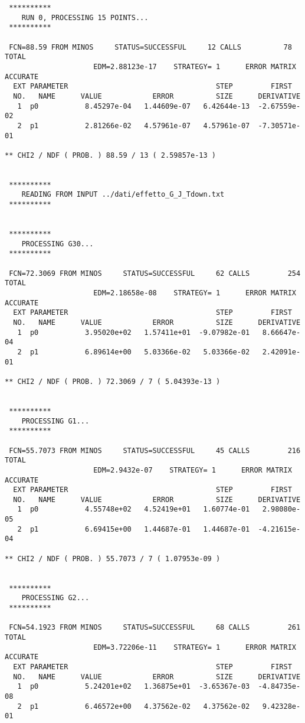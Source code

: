 {\fontsize{6}{6}
\begin{verbatim}
 **********
    RUN 0, PROCESSING 15 POINTS...
 **********

 FCN=88.59 FROM MINOS     STATUS=SUCCESSFUL     12 CALLS          78 TOTAL
                     EDM=2.88123e-17    STRATEGY= 1      ERROR MATRIX ACCURATE 
  EXT PARAMETER                                   STEP         FIRST   
  NO.   NAME      VALUE            ERROR          SIZE      DERIVATIVE 
   1  p0           8.45297e-04   1.44609e-07   6.42644e-13  -2.67559e-02
   2  p1           2.81266e-02   4.57961e-07   4.57961e-07  -7.30571e-01

** CHI2 / NDF ( PROB. ) 88.59 / 13 ( 2.59857e-13 )


 **********
    READING FROM INPUT ../dati/effetto_G_J_Tdown.txt
 **********


 **********
    PROCESSING G30...
 **********

 FCN=72.3069 FROM MINOS     STATUS=SUCCESSFUL     62 CALLS         254 TOTAL
                     EDM=2.18658e-08    STRATEGY= 1      ERROR MATRIX ACCURATE 
  EXT PARAMETER                                   STEP         FIRST   
  NO.   NAME      VALUE            ERROR          SIZE      DERIVATIVE 
   1  p0           3.95020e+02   1.57411e+01  -9.07982e-01   8.66647e-04
   2  p1           6.89614e+00   5.03366e-02   5.03366e-02   2.42091e-01

** CHI2 / NDF ( PROB. ) 72.3069 / 7 ( 5.04393e-13 )


 **********
    PROCESSING G1...
 **********

 FCN=55.7073 FROM MINOS     STATUS=SUCCESSFUL     45 CALLS         216 TOTAL
                     EDM=2.9432e-07    STRATEGY= 1      ERROR MATRIX ACCURATE 
  EXT PARAMETER                                   STEP         FIRST   
  NO.   NAME      VALUE            ERROR          SIZE      DERIVATIVE 
   1  p0           4.55748e+02   4.52419e+01   1.60774e-01   2.98080e-05
   2  p1           6.69415e+00   1.44687e-01   1.44687e-01  -4.21615e-04

** CHI2 / NDF ( PROB. ) 55.7073 / 7 ( 1.07953e-09 )


 **********
    PROCESSING G2...
 **********

 FCN=54.1923 FROM MINOS     STATUS=SUCCESSFUL     68 CALLS         261 TOTAL
                     EDM=3.72206e-11    STRATEGY= 1      ERROR MATRIX ACCURATE 
  EXT PARAMETER                                   STEP         FIRST   
  NO.   NAME      VALUE            ERROR          SIZE      DERIVATIVE 
   1  p0           5.24201e+02   1.36875e+01  -3.65367e-03  -4.84735e-08
   2  p1           6.46572e+00   4.37562e-02   4.37562e-02   9.42328e-01


\end{verbatim}}
